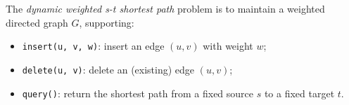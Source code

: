 \documentclass[11pt]{article}
\begin{document}
The \emph{dynamic weighted s-t shortest path} problem is to maintain a weighted directed graph $G$, supporting:
\begin{itemize}
	\item
		\verb+insert(u, v, w)+: insert an edge $(u, v)$ with weight $w$;
	\item
		\verb+delete(u, v)+: delete an (existing) edge $(u, v)$;
	\item
		\verb+query()+: return the shortest path from a fixed source $s$ to a fixed target $t$.
\end{itemize}

\iftoggle{conf}{
\section{Preliminaries on Cell-probe Model}\label{sectcp_app}
\cellprobepre

\section{Preliminaries on Communication Complexity}\label{sectpre_app}
\sectprecomm

\section{Full Version}
}{}
\end{document}
